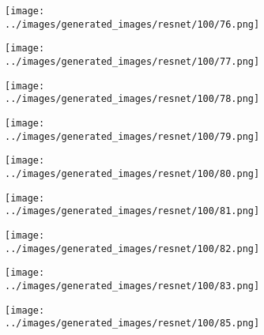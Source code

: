 \begin{figure}[H]
\begin{subfigure}[b]{0.1\textwidth}
\end{subfigure}
\hspace{1em}%
\begin{subfigure}[b]{0.1\textwidth}
\centering
\texttt{[image: ../images/generated\_images/resnet/100/76.png]}
\end{subfigure}
\hspace{1em}%
\begin{subfigure}[b]{0.1\textwidth}
\centering
\texttt{[image: ../images/generated\_images/resnet/100/77.png]}
\end{subfigure}
\hspace{1em}%
\begin{subfigure}[b]{0.1\textwidth}
\centering
\texttt{[image: ../images/generated\_images/resnet/100/78.png]}
\end{subfigure}
\hspace{1em}%
\begin{subfigure}[b]{0.1\textwidth}
\centering
\texttt{[image: ../images/generated\_images/resnet/100/79.png]}
\end{subfigure}
\hspace{1em}%
\begin{subfigure}[b]{0.1\textwidth}
\centering
\texttt{[image: ../images/generated\_images/resnet/100/80.png]}
\end{subfigure}
\hspace{1em}%
\begin{subfigure}[b]{0.1\textwidth}
\centering
\texttt{[image: ../images/generated\_images/resnet/100/81.png]}
\end{subfigure}
\hspace{1em}%
\begin{subfigure}[b]{0.1\textwidth}
\centering
\texttt{[image: ../images/generated\_images/resnet/100/82.png]}
\end{subfigure}
\hspace{1em}%
\begin{subfigure}[b]{0.1\textwidth}
\centering
\texttt{[image: ../images/generated\_images/resnet/100/83.png]}
\end{subfigure}
\hspace{1em}%
\begin{subfigure}[b]{0.1\textwidth}
\centering
\texttt{[image: ../images/generated\_images/resnet/100/85.png]}
\end{subfigure}
\hspace{1em}%

\end{figure}
